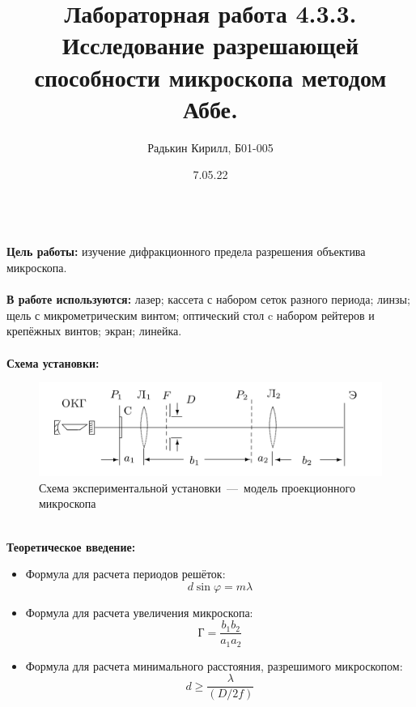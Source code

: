 \documentclass[a4paper, 12pt]{article}
\author{Радькин Кирилл, Б01-005}
\date{7.05.22}
\title{Лабораторная работа 4.3.3. Исследование разрешающей способности микроскопа методом Аббе.}
\renewcommand{\phi}{\varphi}
\begin{document}
\maketitle
\thispagestyle{empty}

\textbf{\\Цель работы:} изучение дифракционного предела разрешения объектива микроскопа.
\\\\
\textbf{В работе используются:} лазер; кассета с набором сеток разного периода; линзы; щель с микрометрическим винтом; оптический стол c набором рейтеров и крепёжных винтов; экран; линейка.
\\\\
\textbf{Схема установки:}

\begin{figure}[!h]
    \centering
    \includegraphics[scale = 0.3]{pic1.png}
    \caption{Схема экспериментальной установки~---~модель проекционного микроскопа}
    \label{pic1}
\end{figure}

\textbf{\\Теоретическое введение:}

\begin{itemize}
    \item Формула для расчета периодов решёток:
        \begin{equation*}
            d \sin \phi = m \lambda
        \end{equation*}

    \item Формула для расчета увеличения микроскопа:
        \begin{equation*}
            Г = \dfrac{b_1 b_2}{a_1 a_2}            
        \end{equation*}

    \item Формула для расчета минимального расстояния, разрешимого микроскопом:
        \begin{equation*}
            d \geq \dfrac{\lambda}{\left( D / 2f \right)} 
        \end{equation*}
\end{itemize}
\end{document}
